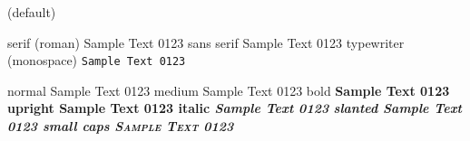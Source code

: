
\Huge
\huge
\LARGE
\Large
\large
\normalsize (default)
\small
\footnotesize
\scriptsize
\tiny


serif (roman)           \textrm{Sample Text 0123} \rmfamily
sans serif              \textsf{Sample Text 0123} \sffamily
typewriter (monospace)  \texttt{Sample Text 0123} \ttfamily

normal      \textnormal{Sample Text 0123}   \normalfont
medium      \textmd{Sample Text 0123}       \mdseries
bold        \textbf{Sample Text 0123}       \bfseries
upright     \textup{Sample Text 0123}       \upshape
italic      \textit{Sample Text 0123}       \itshape
slanted     \textsl{Sample Text 0123}       \slshape
small caps  \textsc{Sample Text 0123}       \scshape
